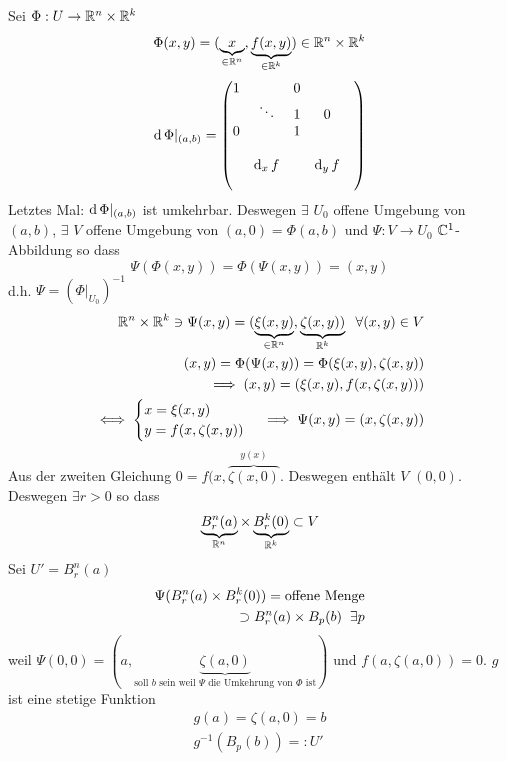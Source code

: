 \begin{Bew}
  Sei $\Phi:U\rightarrow\mathbb{R}^n\times\mathbb{R}^k$
  \[\Phi(x,y)=(\underbrace{x}_{\in\mathbb{R}^n},\underbrace{f(x,y)}_{\in\mathbb{R}^k})\in\mathbb{R}^n\times\mathbb{R}^k\]
  \[\operatorname{d}\Phi|_{(a,b)}= \begin{pmatrix}
    1 & & 0 & & \\
    & \ddots & 1 & 0 & \\
    0 & & 1 & & \\
    & & & & \\
    & \operatorname{d}_x f & & \operatorname{d}_y f \\
    & & & & \\
  \end{pmatrix} \]
  Letztes Mal: $\operatorname{d}\Phi|_{(a,b)}$ ist umkehrbar. Deswegen $\exists$ $U_0$ offene Umgebung von $(a,b)$, $\exists$ $V$ offene Umgebung von $(a,0)=\Phi(a,b)$ und $\Psi:V\to U_0$ $\mathbb{C}^1$-Abbildung so dass
  \[\Psi(\Phi(x,y))=\Phi(\Psi(x,y))=(x,y)\]
  d.h. $\Psi=\left( \Phi|_{U_0} \right)^{-1}$
  \begin{eqnarray*}
    \mathbb{R}^n\times\mathbb{R}^k\ni\Psi(x,y)=(\underbrace{\xi(x,y)}_{\in\mathbb{R}^n},\underbrace{\zeta(x,y))}_{\mathbb{R}^k}\hspace{2mm}\forall (x,y)\in V\\
    (x,y)=\Phi(\Psi(x,y))=\Phi(\xi(x,y),\zeta(x,y))\\
    \implies (x,y)=(\xi(x,y), f(x,\zeta(x,y)))\\
    \iff \begin{cases}
      x=\xi(x,y)\\
      y=f(x,\zeta(x,y))
    \end{cases}\implies \Psi(x,y)=(x,\zeta(x,y)) \\
  \end{eqnarray*}
  Aus der zweiten Gleichung $0=f(x,\overbrace{\zeta(x,0)}^{y(x)}$. Deswegen enthält $V$ $(0,0)$. Deswegen $\exists r > 0$ so dass
  \[\underbrace{B^n_r(a)}_{\mathbb{R}^n}\times \underbrace{B^k_r(0)}_{\mathbb{R}^k}\subset V\]
  Sei $U'=B_r^n(a)$
  \begin{eqnarray*}
    \Psi(B^n_r(a)\times B_r^k(0))=\text{offene Menge}\\
    \supset B^n_r(a)\times B_p(b)\hspace{2mm} \exists p\\
  \end{eqnarray*}
    weil $\Psi(0,0)=(a,\underbrace{\zeta(a,0)}_{\text{soll $b$ sein weil $\Psi$ die Umkehrung von $\Phi$ ist}})$ und $f(a,\zeta(a,0))=0$. $g$ ist eine stetige Funktion
    \begin{eqnarray*}
      g(a)=\zeta(a,0)=b\\
      g^{-1}(B_p(b))=:U'

\end{eqnarray*}
\end{Bew}
